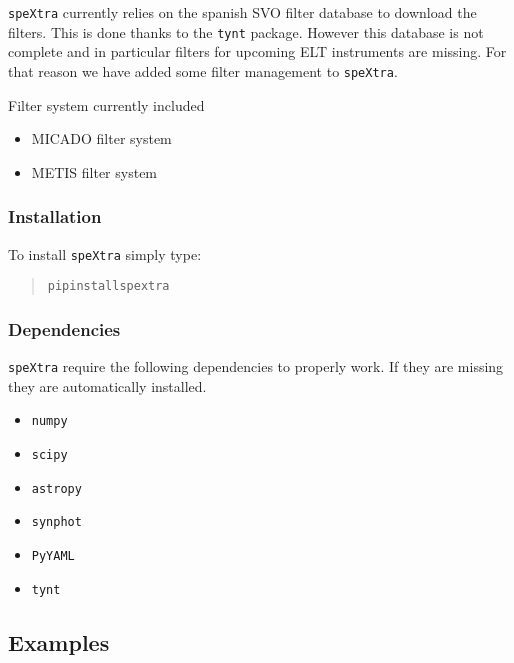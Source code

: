 \texttt{speXtra} currently relies on the spanish SVO filter database to download the filters. This is done thanks
to the \texttt{tynt} package. However this database is not complete and in particular filters for upcoming
ELT instruments are missing. For that reason we have added some filter management to \texttt{speXtra}.

Filter system currently included

\begin{itemize}
\item MICADO filter system

\item METIS filter system
\end{itemize}


\subsubsection{Installation%
  \label{installation}%
}

To install \texttt{speXtra} simply type:

\begin{quote}
\begin{alltt}
pip install spextra
\end{alltt}
\end{quote}


\subsubsection{Dependencies%
  \label{dependencies}%
}

\texttt{speXtra} require the following dependencies to properly work. If they are missing they are automatically
installed.

\begin{itemize}
\item \texttt{numpy}

\item \texttt{scipy}

\item \texttt{astropy}

\item \texttt{synphot}

\item \texttt{PyYAML}

\item \texttt{tynt}
\end{itemize}


\subsection{Examples%
  \label{examples}%
}
